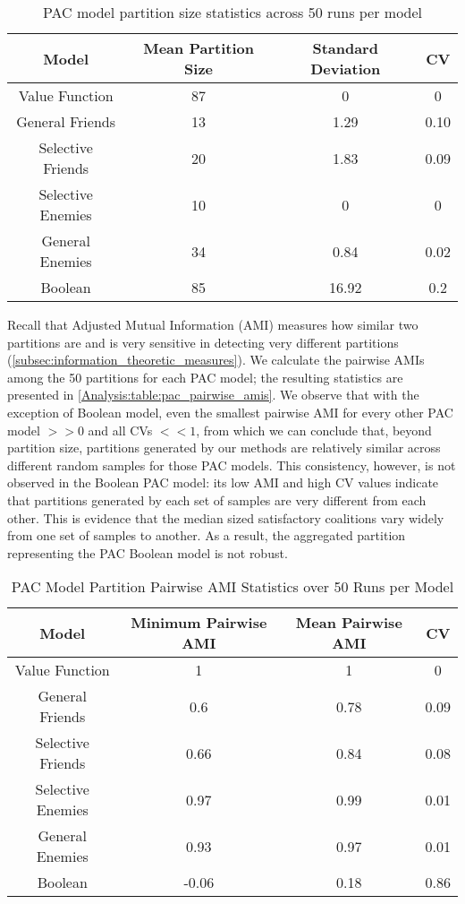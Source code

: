 \begin{table}[ht]
\centering
\begin{tabular}{|c|c|c|c|}
\hline
  Model & Mean Partition Size & Standard Deviation & CV \\ \hline
Value Function & 87 & 0 & 0 \\
General Friends & 13 & 1.29 & 0.10  \\
Selective Friends & 20 & 1.83 & 0.09  \\
Selective Enemies & 10 & 0 & 0 \\
General Enemies & 34 & 0.84 & 0.02 \\
Boolean & 85 & 16.92 & 0.2  \\
\hline
\end{tabular}
\caption{PAC model partition size statistics across 50 runs per model}
\label{Analysis:table:pac_num_coalitions}
\end{table}

Recall that Adjusted Mutual Information (AMI) measures how similar two
partitions are and is very sensitive in detecting very different partitions
(\autoref{subsec:information_theoretic_measures}).
We calculate the pairwise AMIs among the 50 partitions for each PAC model;
the resulting statistics are presented in \autoref{Analysis:table:pac_pairwise_amis}.
We observe that with the exception of Boolean model, even the smallest pairwise
AMI for every other PAC model $>> 0$ and all CVs $<< 1$, from which we can
conclude that, beyond partition size, partitions generated by our methods are
relatively similar across different random samples for those PAC models.
This consistency, however, is not observed in the Boolean PAC model: its low AMI
and high CV values indicate that partitions generated by each set of samples are
very different from each other.
This is evidence that the median sized satisfactory coalitions vary widely from
one set of samples to another.
As a result, the aggregated partition representing the PAC Boolean model is not robust.

\begin{table}[ht]
\centering
\begin{tabular}{|c|c|c|c|}
\hline
  Model & Minimum Pairwise AMI & Mean Pairwise AMI & CV \\ \hline
Value Function & 1 & 1 & 0 \\
General Friends & 0.6 & 0.78 & 0.09  \\
Selective Friends & 0.66 & 0.84 & 0.08  \\
Selective Enemies & 0.97 & 0.99 & 0.01 \\
General Enemies & 0.93 & 0.97 & 0.01 \\
Boolean & -0.06 & 0.18 & 0.86  \\
\hline
\end{tabular}
\caption{PAC Model Partition Pairwise AMI Statistics over 50 Runs per Model}
\label{Analysis:table:pac_pairwise_amis}
\end{table}

